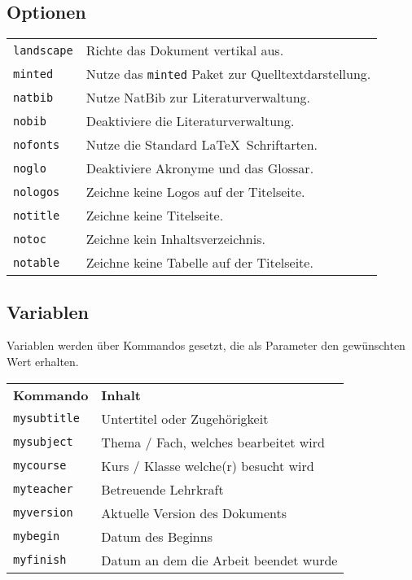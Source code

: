 \subsection{Optionen}
\begin{tabularx}{\textwidth}{l X}
{\small \verb|landscape|}    & Richte das Dokument vertikal aus.\\
{\small \verb|minted|}       & Nutze das \texttt{minted} Paket zur Quelltextdarstellung.\\
{\small \verb|natbib|}       & Nutze NatBib zur Literaturverwaltung.\\
{\small \verb|nobib|}        & Deaktiviere die Literaturverwaltung.\\
{\small \verb|nofonts|}      & Nutze die Standard \LaTeX ~Schriftarten.\\
{\small \verb|noglo|}        & Deaktiviere Akronyme und das Glossar.\\
{\small \verb|nologos|}      & Zeichne keine Logos auf der Titelseite.\\
{\small \verb|notitle|}      & Zeichne keine Titelseite.\\
{\small \verb|notoc|}        & Zeichne kein Inhaltsverzeichnis.\\
{\small \verb|notable|}      & Zeichne keine Tabelle auf der Titelseite.
\end{tabularx}

\subsection{Variablen}
Variablen werden über Kommandos gesetzt, die als Parameter den gewünschten Wert erhalten.
\begin{center}
    \ifminted   {}
    \else       {}\fi
\end{center}

\begin{tabular}{l l}
\textbf{Kommando} & \textbf{Inhalt}\\

{\small \verb|mysubtitle|} 	& Untertitel oder Zugehörigkeit\\
{\small \verb|mysubject|} 	& Thema / Fach, welches bearbeitet wird\\
{\small \verb|mycourse|} 	& Kurs / Klasse welche(r) besucht wird\\
{\small \verb|myteacher|} 	& Betreuende Lehrkraft\\
{\small \verb|myversion|} 	& Aktuelle Version des Dokuments\\
{\small \verb|mybegin|} 	& Datum des Beginns\\
{\small \verb|myfinish|} 	& Datum an dem die Arbeit beendet wurde
\end{tabular}

